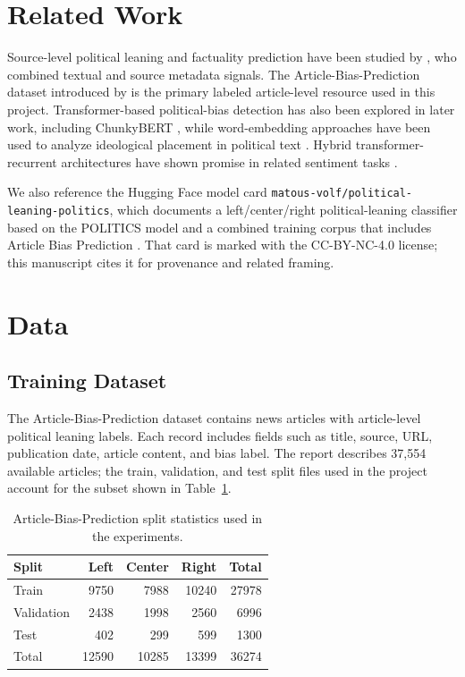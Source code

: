 \documentclass[10pt,twocolumn]{article}
\begin{document}
\section{Related Work}

Source-level political leaning and factuality prediction have been studied by
\citet{baly2018predicting}, who combined textual and source metadata signals.
The Article-Bias-Prediction dataset introduced by \citet{baly2020detect} is the
primary labeled article-level resource used in this project. Transformer-based
political-bias detection has also been explored in later work, including
ChunkyBERT \citep{loiya2026chunkybert}, while word-embedding approaches have
been used to analyze ideological placement in political text
\citep{rheault2019word}. Hybrid transformer-recurrent architectures have shown
promise in related sentiment tasks \citep{tan2022roberta}.

We also reference the Hugging Face model card
\texttt{matous-volf/political-leaning-politics}, which documents a
left/center/right political-leaning classifier based on the POLITICS model and
a combined training corpus that includes Article Bias Prediction
\citep{huggingfacepolitics}. That card is marked with the CC-BY-NC-4.0 license;
this manuscript cites it for provenance and related framing.

\section{Data}

\subsection{Training Dataset}

The Article-Bias-Prediction dataset contains news articles with article-level
political leaning labels. Each record includes fields such as title, source,
URL, publication date, article content, and bias label. The report describes
37,554 available articles; the train, validation, and test split files used in
the project account for the subset shown in Table~\ref{tab:splits}.

\begin{table}[h]
\centering
\caption{Article-Bias-Prediction split statistics used in the experiments.}
\label{tab:splits}
\begin{tabular}{lrrrr}
\toprule
Split & Left & Center & Right & Total \\
\midrule
Train & 9750 & 7988 & 10240 & 27978 \\
Validation & 2438 & 1998 & 2560 & 6996 \\
Test & 402 & 299 & 599 & 1300 \\
\midrule
Total & 12590 & 10285 & 13399 & 36274 \\
\bottomrule
\end{tabular}
\end{table}
\end{document}
